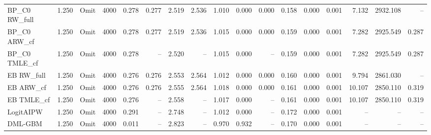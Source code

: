 \begin{tabular}{llllrrrrrrrrrrrrr}
BP\_C0 RW\_full & 1.250 & Omit & 4000 & 0.278 & 0.277 & 2.519 & 2.536 & 1.010 & 0.000 & 0.000 & 0.158 & 0.000 & 0.001 & 7.132 & 2932.108 & -- \\
BP\_C0 ARW\_cf & 1.250 & Omit & 4000 & 0.278 & 0.277 & 2.519 & 2.536 & 1.015 & 0.000 & 0.000 & 0.159 & 0.000 & 0.001 & 7.282 & 2925.549 & 0.287 \\
BP\_C0 TMLE\_cf & 1.250 & Omit & 4000 & 0.278 & -- & 2.520 & -- & 1.015 & 0.000 & -- & 0.159 & 0.000 & 0.001 & 7.282 & 2925.549 & 0.287 \\
EB RW\_full & 1.250 & Omit & 4000 & 0.276 & 0.276 & 2.553 & 2.564 & 1.012 & 0.000 & 0.000 & 0.160 & 0.000 & 0.001 & 9.794 & 2861.030 & -- \\
EB ARW\_cf & 1.250 & Omit & 4000 & 0.276 & 0.276 & 2.555 & 2.564 & 1.018 & 0.000 & 0.000 & 0.161 & 0.000 & 0.001 & 10.107 & 2850.110 & 0.319 \\
EB TMLE\_cf & 1.250 & Omit & 4000 & 0.276 & -- & 2.558 & -- & 1.017 & 0.000 & -- & 0.161 & 0.000 & 0.001 & 10.107 & 2850.110 & 0.319 \\
LogitAIPW & 1.250 & Omit & 4000 & 0.291 & -- & 2.748 & -- & 1.012 & 0.000 & -- & 0.172 & 0.000 & 0.001 & -- & -- & -- \\
DML-GBM & 1.250 & Omit & 4000 & 0.011 & -- & 2.823 & -- & 0.970 & 0.932 & -- & 0.170 & 0.000 & 0.001 & -- & -- & -- \\
\hline
\end{tabular}
